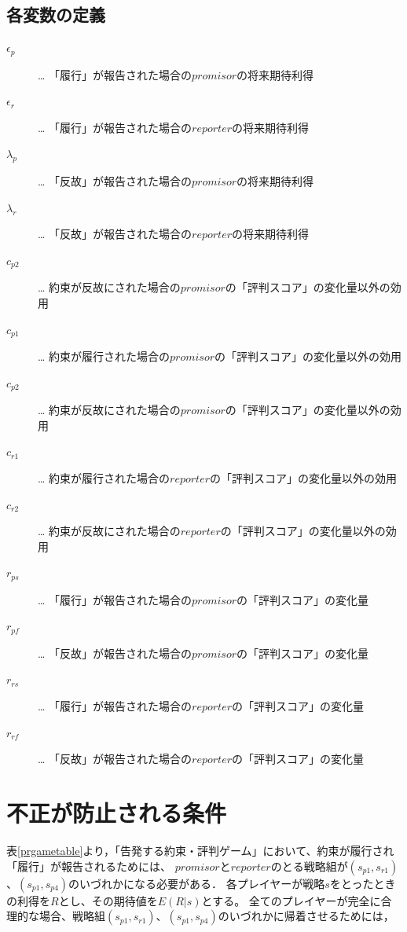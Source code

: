 \subsection{各変数の定義}
\begin{description}
  \item[$\epsilon_p$]… 「履行」が報告された場合の$promisor$の将来期待利得
  \item[$\epsilon_r$]… 「履行」が報告された場合の$reporter$の将来期待利得
  \item[$\lambda_p$]… 「反故」が報告された場合の$promisor$の将来期待利得
  \item[$\lambda_r$]… 「反故」が報告された場合の$reporter$の将来期待利得
  \item[$c_{p2}$]… 約束が反故にされた場合の$promisor$の「評判スコア」の変化量以外の効用
  \item[$c_{p1}$]… 約束が履行された場合の$promisor$の「評判スコア」の変化量以外の効用
  \item[$c_{p2}$]… 約束が反故にされた場合の$promisor$の「評判スコア」の変化量以外の効用
  \item[$c_{r1}$]… 約束が履行された場合の$reporter$の「評判スコア」の変化量以外の効用
  \item[$c_{r2}$]… 約束が反故にされた場合の$reporter$の「評判スコア」の変化量以外の効用
  \item[$r_{ps}$]… 「履行」が報告された場合の$promisor$の「評判スコア」の変化量
  \item[$r_{pf}$]… 「反故」が報告された場合の$promisor$の「評判スコア」の変化量
  \item[$r_{rs}$]… 「履行」が報告された場合の$reporter$の「評判スコア」の変化量
  \item[$r_{rf}$]… 「反故」が報告された場合の$reporter$の「評判スコア」の変化量
\end{description}

\section{不正が防止される条件}
表\ref{prgametable}より，「告発する約束・評判ゲーム」において、約束が履行され「履行」が報告されるためには、
$promisor$と$reporter$のとる戦略組が$ (s_{p1}, s_{r1})$、$(s_{p1}, s_{p4})$のいづれかになる必要がある．
各プレイヤーが戦略$s$をとったときの利得を$R$とし、その期待値を$E(R|s)$とする。
全てのプレイヤーが完全に合理的な場合、戦略組$(s_{p1}, s_{r1})$、$(s_{p1}, s_{p4})$のいづれかに帰着させるためには，

